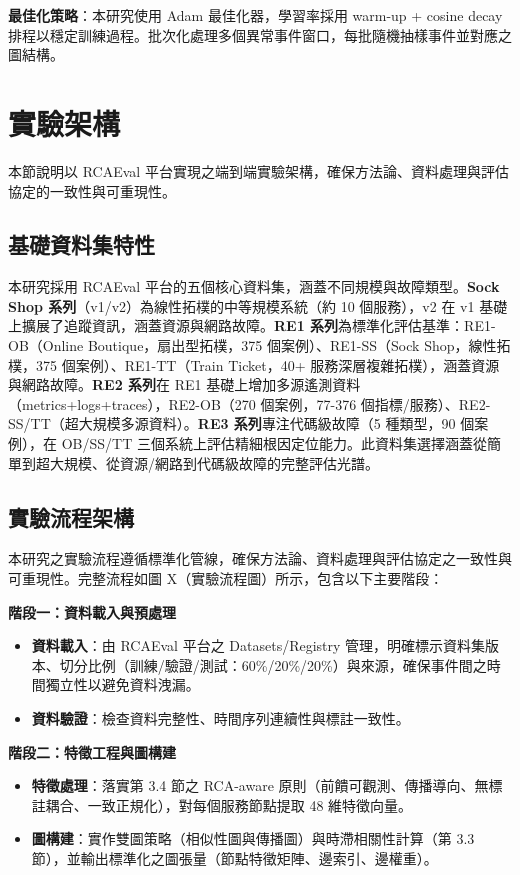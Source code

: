 \documentclass[10pt,a4paper,twocolumn]{article}
\begin{document}
\textbf{最佳化策略}：本研究使用 Adam 最佳化器，學習率採用 warm-up + cosine decay 排程以穩定訓練過程。批次化處理多個異常事件窗口，每批隨機抽樣事件並對應之圖結構。

\section{實驗架構}

本節說明以 RCAEval 平台實現之端到端實驗架構，確保方法論、資料處理與評估協定的一致性與可重現性。

\subsection{基礎資料集特性}

本研究採用 RCAEval 平台的五個核心資料集，涵蓋不同規模與故障類型。\textbf{Sock Shop 系列}（v1/v2）為線性拓樸的中等規模系統（約 10 個服務），v2 在 v1 基礎上擴展了追蹤資訊，涵蓋資源與網路故障。\textbf{RE1 系列}為標準化評估基準：RE1-OB（Online Boutique，扇出型拓樸，375 個案例）、RE1-SS（Sock Shop，線性拓樸，375 個案例）、RE1-TT（Train Ticket，40+ 服務深層複雜拓樸），涵蓋資源與網路故障。\textbf{RE2 系列}在 RE1 基礎上增加多源遙測資料（metrics+logs+traces），RE2-OB（270 個案例，77-376 個指標/服務）、RE2-SS/TT（超大規模多源資料）。\textbf{RE3 系列}專注代碼級故障（5 種類型，90 個案例），在 OB/SS/TT 三個系統上評估精細根因定位能力。此資料集選擇涵蓋從簡單到超大規模、從資源/網路到代碼級故障的完整評估光譜。

\subsection{實驗流程架構}

本研究之實驗流程遵循標準化管線，確保方法論、資料處理與評估協定之一致性與可重現性。完整流程如圖 X（實驗流程圖）所示，包含以下主要階段：

\textbf{階段一：資料載入與預處理}
\begin{itemize}
\item \textbf{資料載入}：由 RCAEval 平台之 Datasets/Registry 管理，明確標示資料集版本、切分比例（訓練/驗證/測試：60\%/20\%/20\%）與來源，確保事件間之時間獨立性以避免資料洩漏。
\item \textbf{資料驗證}：檢查資料完整性、時間序列連續性與標註一致性。
\end{itemize}

\textbf{階段二：特徵工程與圖構建}
\begin{itemize}
\item \textbf{特徵處理}：落實第 3.4 節之 RCA-aware 原則（前饋可觀測、傳播導向、無標註耦合、一致正規化），對每個服務節點提取 48 維特徵向量。
\item \textbf{圖構建}：實作雙圖策略（相似性圖與傳播圖）與時滯相關性計算（第 3.3 節），並輸出標準化之圖張量（節點特徵矩陣、邊索引、邊權重）。
\end{itemize}
\end{document}
